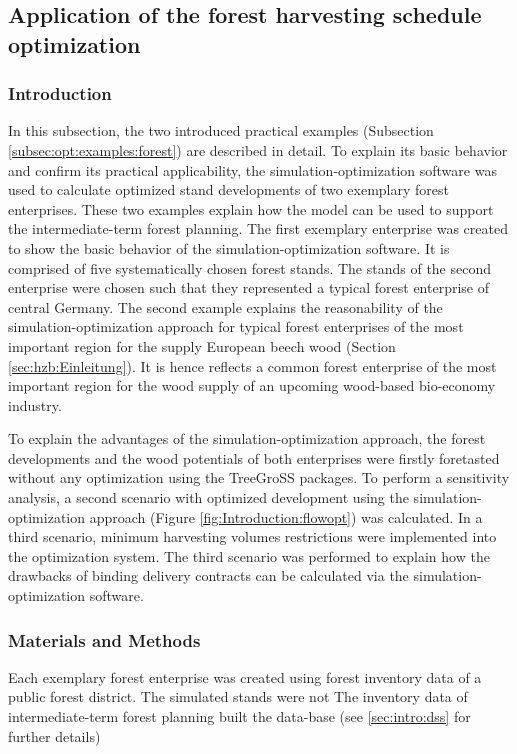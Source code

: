 \subsection{Application of the forest harvesting schedule optimization}
\label{subsec:discussion:struct:opt:application}
\subsubsection{Introduction}
\label{subsubsec:discussion:struct:opt:application:introduction}
In this subsection, the two introduced practical examples (Subsection \ref{subsec:opt:examples:forest}) are described in detail. To explain its basic behavior and confirm its practical applicability, the si\-mu\-la\-tion-op\-ti\-mi\-za\-tion software was used to calculate optimized stand developments of two exemplary forest enterprises. These two examples explain how the model can be used to support the intermediate-term forest planning. The first exemplary enterprise was created to show the basic behavior of the simulation-optimization software. It is comprised of five systematically chosen forest stands. The stands of the second enterprise were chosen such that they represented a typical forest enterprise of central Germany. The second example explains the reasonability of the simulation-optimization approach for typical forest enterprises of the most important region for the supply European beech wood (Section \ref{sec:hzb:Einleitung}). It is hence reflects a common forest enterprise of the most important region for the wood supply of an upcoming wood-based bio-economy industry.

To explain the advantages of the simulation-optimization approach, the forest developments and the wood potentials of both enterprises were firstly foretasted without any optimization using the TreeGroSS packages. To perform a sensitivity analysis, a second scenario with optimized development using the simulation-optimization approach (Figure \ref{fig:Introduction:flowopt}) was calculated. In a third scenario, minimum harvesting volumes restrictions were implemented into the optimization system. The third scenario was performed to explain how the drawbacks of binding delivery contracts can be calculated via the si\-mu\-la\-tion-op\-ti\-mi\-za\-tion software.

\subsubsection{Materials and Methods}
\label{subsubsec:discussion:struct:opt:application:method}
Each exemplary forest enterprise was created using forest inventory data of a public forest district. The simulated stands were not 
The inventory data of intermediate-term forest planning built the data-base
 (see \ref{sec:intro:dss} for further details)
 
